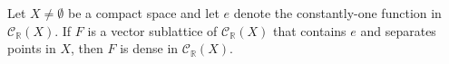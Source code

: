 Let $X \neq \emptyset$ be a compact space and let $e$ denote the constantly-one function in $\mathcal{C}_{\mathbb{R}}(X)$. If $F$ is a vector sublattice of $\mathcal{C}_{\mathbb{R}}(X)$ that contains $e$ and separates points in $X$, then $F$ is dense in $\mathcal{C}_{\mathbb{R}}(X)$.
